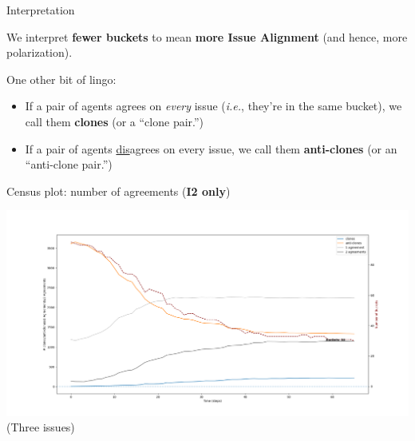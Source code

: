 \documentclass[12pt]{beamer}
\begin{document}
\begin{frame}[c]{Interpretation} %

\large
We interpret \textbf{fewer buckets} to mean \textbf{more Issue Alignment} (and hence, more polarization).

\pause
\normalsize
\bigskip
One other bit of lingo:

\begin{itemize}
\itemsep.1em
\item If a pair of agents agrees on \textit{every} issue (\textit{i.e.}, they're in
the same bucket), we call them \textbf{clones} (or a ``clone pair.'')

\bigskip

\item If a pair of agents \underline{dis}agrees on every issue, we call them
\textbf{anti-clones} (or an ``anti-clone pair.'')
\end{itemize}

\end{frame}


\begin{frame}[c]{Census plot: number of agreements (\textbf{I2 only})} %

\vspace{-.3in}
\begin{center}
\hspace{-.6in} \includegraphics[width=1.11\textwidth]{census3issuesI2.png}
\vspace{-.3in}
\scriptsize (Three issues)
\end{center}

\end{frame}
\end{document}
